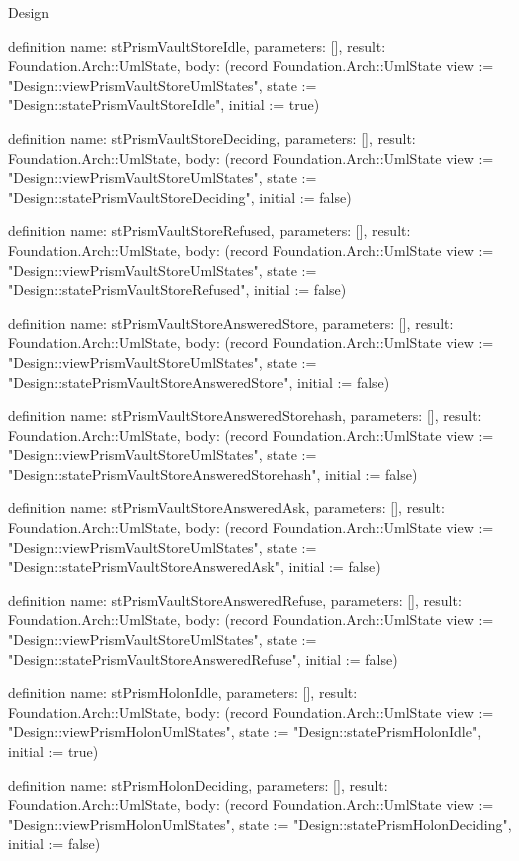 \begin{lexlean}{Design}
\begin{semanticmodule}
definition{
  name: stPrismVaultStoreIdle,
  parameters: [],
  result: Foundation.Arch::UmlState,
  body: (record Foundation.Arch::UmlState {view := "Design::viewPrismVaultStoreUmlStates", state := "Design::statePrismVaultStoreIdle", initial := true})
}

definition{
  name: stPrismVaultStoreDeciding,
  parameters: [],
  result: Foundation.Arch::UmlState,
  body: (record Foundation.Arch::UmlState {view := "Design::viewPrismVaultStoreUmlStates", state := "Design::statePrismVaultStoreDeciding", initial := false})
}

definition{
  name: stPrismVaultStoreRefused,
  parameters: [],
  result: Foundation.Arch::UmlState,
  body: (record Foundation.Arch::UmlState {view := "Design::viewPrismVaultStoreUmlStates", state := "Design::statePrismVaultStoreRefused", initial := false})
}

definition{
  name: stPrismVaultStoreAnsweredStore,
  parameters: [],
  result: Foundation.Arch::UmlState,
  body: (record Foundation.Arch::UmlState {view := "Design::viewPrismVaultStoreUmlStates", state := "Design::statePrismVaultStoreAnsweredStore", initial := false})
}

definition{
  name: stPrismVaultStoreAnsweredStorehash,
  parameters: [],
  result: Foundation.Arch::UmlState,
  body: (record Foundation.Arch::UmlState {view := "Design::viewPrismVaultStoreUmlStates", state := "Design::statePrismVaultStoreAnsweredStorehash", initial := false})
}

definition{
  name: stPrismVaultStoreAnsweredAsk,
  parameters: [],
  result: Foundation.Arch::UmlState,
  body: (record Foundation.Arch::UmlState {view := "Design::viewPrismVaultStoreUmlStates", state := "Design::statePrismVaultStoreAnsweredAsk", initial := false})
}

definition{
  name: stPrismVaultStoreAnsweredRefuse,
  parameters: [],
  result: Foundation.Arch::UmlState,
  body: (record Foundation.Arch::UmlState {view := "Design::viewPrismVaultStoreUmlStates", state := "Design::statePrismVaultStoreAnsweredRefuse", initial := false})
}

definition{
  name: stPrismHolonIdle,
  parameters: [],
  result: Foundation.Arch::UmlState,
  body: (record Foundation.Arch::UmlState {view := "Design::viewPrismHolonUmlStates", state := "Design::statePrismHolonIdle", initial := true})
}

definition{
  name: stPrismHolonDeciding,
  parameters: [],
  result: Foundation.Arch::UmlState,
  body: (record Foundation.Arch::UmlState {view := "Design::viewPrismHolonUmlStates", state := "Design::statePrismHolonDeciding", initial := false})
}


\end{semanticmodule}
\end{lexlean}
